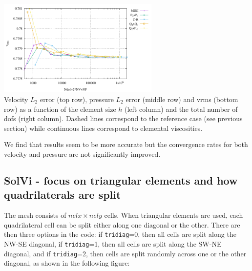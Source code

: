 \begin{center}
\includegraphics[width=8cm]{python_codes/fieldstone_112/results/exp5_avrg/vrms_ndof.pdf}\\
{\captionfont Velocity $L_2$ error (top row), pressure $L_2$ error (middle row) and vrms (bottom row) 
as a function of the element size $h$ (left column) and the total number of dofs (right column).
Dashed lines correspond to the reference case (see previous section) while continuous lines
correspond to elemental viscosities. }
\end{center}
 
We find that results seem to be more accurate but the convergence rates for both 
velocity and pressure are not significantly improved.


\newpage
\subsection*{SolVi - focus on triangular elements and how quadrilaterals are split}
The mesh consists of $nelx \times nely$ cells. When triangular elements are used, 
each quadrilateral cell can be split either along one diagonal or the other. 
There are then three options in the code: if {\tt tridiag}=0, then all cells are split 
along the NW-SE diagonal, if {\tt tridiag}=1, then all cells are split
along the SW-NE diagonal, and if {\tt tridiag}=2, then cells are split 
randomly across one or the other diagonal, as shown in the following figure:


